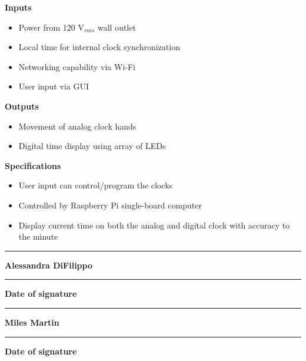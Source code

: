 \documentclass[11pt]{article}
\begin{document}
\textbf{Inputs}
\begin{itemize}
  \setlength\itemsep{0.15em}
  \item Power from 120 V$_{rms}$ wall outlet
  \item Local time for internal clock synchronization
  \item Networking capability via Wi-Fi
  \item User input via GUI
\end{itemize}

\textbf{Outputs}
\begin{itemize}
  \item Movement of analog clock hands
  \item Digital time display using array of LEDs
\end{itemize}

\textbf{Specifications}

\begin{itemize}
  \item User input can control/program the clocks
  \item Controlled by Raspberry Pi single-board computer
  \item Display current time on both the analog and digital clock with accuracy to the minute
  
\end{itemize}


\newcommand\signature[1]{%
\noindent\begin{minipage}{5cm}
    \noindent\vspace{1cm}\par
    \noindent\rule{6cm}{1pt}\par
    \noindent\textbf{#1}
\end{minipage}}

\signature{Alessandra DiFilippo} \hfill \signature{Date of signature}

\signature{Miles Martin}\hfill\signature{Date of signature}

\newpage
\end{document}
